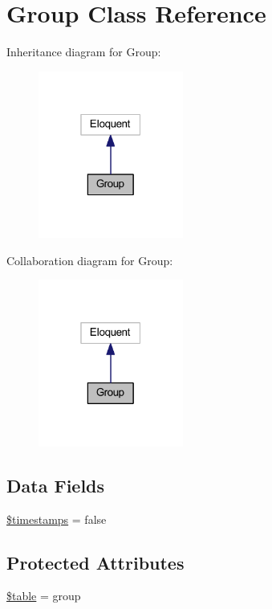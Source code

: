 \hypertarget{class_group}{}\section{Group Class Reference}
\label{class_group}


Inheritance diagram for Group\+:
\nopagebreak
\begin{figure}[H]
\begin{center}
\leavevmode
\includegraphics[width=135pt]{class_group__inherit__graph}
\end{center}
\end{figure}


Collaboration diagram for Group\+:
\nopagebreak
\begin{figure}[H]
\begin{center}
\leavevmode
\includegraphics[width=135pt]{class_group__coll__graph}
\end{center}
\end{figure}
\subsection*{Data Fields}
\begin{DoxyCompactItemize}
\item 
\hyperlink{class_group_a51267c24c8fae742ed8f9be0ba6085ee}{\$timestamps} = false
\end{DoxyCompactItemize}
\subsection*{Protected Attributes}
\begin{DoxyCompactItemize}
\item 
\hyperlink{class_group_ae8876a14058f368335baccf35af4a22b}{\$table} = \textquotesingle{}group\textquotesingle{}
\end{DoxyCompactItemize}


